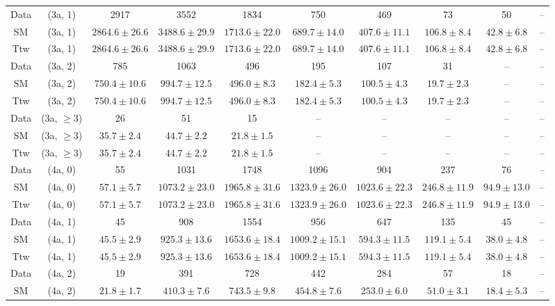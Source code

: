 \begin{table}[h!]
{\begin{tabular}{cccccccccc}
	Data & (3a, 1) & 2917 & 3552 & 1834 & 750 & 469 & 73 & 50 & -- \\[0.5ex] 
	SM & (3a, 1) & $2864.6\pm 26.6$ & $3488.6\pm 29.9$ & $1713.6\pm 22.0$ & $689.7\pm 14.0$ & $407.6\pm 11.1$ & $106.8\pm 8.4$ & $42.8\pm 6.8$ & -- \\[0.5ex] 
	Ttw & (3a, 1) & $2864.6\pm 26.6$ & $3488.6\pm 29.9$ & $1713.6\pm 22.0$ & $689.7\pm 14.0$ & $407.6\pm 11.1$ & $106.8\pm 8.4$ & $42.8\pm 6.8$ & -- \\[0.5ex] 
	Data & (3a, 2) & 785 & 1063 & 496 & 195 & 107 & 31 & -- & -- \\[0.5ex] 
	SM & (3a, 2) & $750.4\pm 10.6$ & $994.7\pm 12.5$ & $496.0\pm 8.3$ & $182.4\pm 5.3$ & $100.5\pm 4.3$ & $19.7\pm 2.3$ & -- & -- \\[0.5ex] 
	Ttw & (3a, 2) & $750.4\pm 10.6$ & $994.7\pm 12.5$ & $496.0\pm 8.3$ & $182.4\pm 5.3$ & $100.5\pm 4.3$ & $19.7\pm 2.3$ & -- & -- \\[0.5ex] 
	Data & (3a, $\ge3$) & 26 & 51 & 15 & -- & -- & -- & -- & -- \\[0.5ex] 
	SM & (3a, $\ge3$) & $35.7\pm 2.4$ & $44.7\pm 2.2$ & $21.8\pm 1.5$ & -- & -- & -- & -- & -- \\[0.5ex] 
	Ttw & (3a, $\ge3$) & $35.7\pm 2.4$ & $44.7\pm 2.2$ & $21.8\pm 1.5$ & -- & -- & -- & -- & -- \\[0.5ex] 
	Data & (4a, 0) & 55 & 1031 & 1748 & 1096 & 904 & 237 & 76 & -- \\[0.5ex] 
	SM & (4a, 0) & $57.1\pm 5.7$ & $1073.2\pm 23.0$ & $1965.8\pm 31.6$ & $1323.9\pm 26.0$ & $1023.6\pm 22.3$ & $246.8\pm 11.9$ & $94.9\pm 13.0$ & -- \\[0.5ex] 
	Ttw & (4a, 0) & $57.1\pm 5.7$ & $1073.2\pm 23.0$ & $1965.8\pm 31.6$ & $1323.9\pm 26.0$ & $1023.6\pm 22.3$ & $246.8\pm 11.9$ & $94.9\pm 13.0$ & -- \\[0.5ex] 
	Data & (4a, 1) & 45 & 908 & 1554 & 956 & 647 & 135 & 45 & -- \\[0.5ex] 
	SM & (4a, 1) & $45.5\pm 2.9$ & $925.3\pm 13.6$ & $1653.6\pm 18.4$ & $1009.2\pm 15.1$ & $594.3\pm 11.5$ & $119.1\pm 5.4$ & $38.0\pm 4.8$ & -- \\[0.5ex] 
	Ttw & (4a, 1) & $45.5\pm 2.9$ & $925.3\pm 13.6$ & $1653.6\pm 18.4$ & $1009.2\pm 15.1$ & $594.3\pm 11.5$ & $119.1\pm 5.4$ & $38.0\pm 4.8$ & -- \\[0.5ex] 
	Data & (4a, 2) & 19 & 391 & 728 & 442 & 284 & 57 & 18 & -- \\[0.5ex] 
	SM & (4a, 2) & $21.8\pm 1.7$ & $410.3\pm 7.6$ & $743.5\pm 9.8$ & $454.8\pm 7.6$ & $253.0\pm 6.0$ & $51.0\pm 3.1$ & $18.4\pm 5.3$ & -- \\[0.5ex] 

\end{tabular}}
\end{table}
